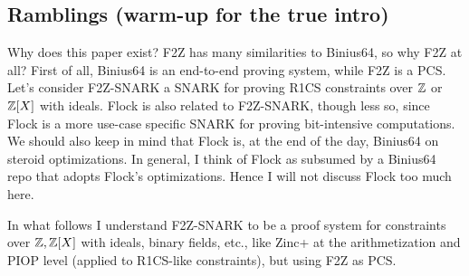 \documentclass[11pt,letterpaper,usenames,dvipsnames]{article}
\begin{document}
\subsection{Ramblings (warm-up for the true intro)}
Why does this paper exist? F2Z has many similarities to Binius64, so why F2Z at all? First of all, Binius64 is an end-to-end proving system, while F2Z is a PCS. Let's consider F2Z-SNARK a SNARK for proving R1CS constraints over $\mathbb{Z}$  or $\mathbb{Z}[X]$ with ideals. Flock is also related to F2Z-SNARK, though less so, since Flock is a more use-case specific SNARK for proving bit-intensive computations. We should also keep in mind that Flock is, at the end of the day, Binius64 on steroid optimizations. In general, I think of Flock as subsumed by a Binius64 repo that adopts Flock's optimizations. Hence I will not discuss Flock too much here.

In what follows I understand F2Z-SNARK to be a proof system for constraints over $\mathbb{Z}, \mathbb{Z}[X]$ with ideals, binary fields, etc., like Zinc+ at the arithmetization and PIOP level (applied to R1CS-like constraints), but using F2Z as PCS.
\end{document}
